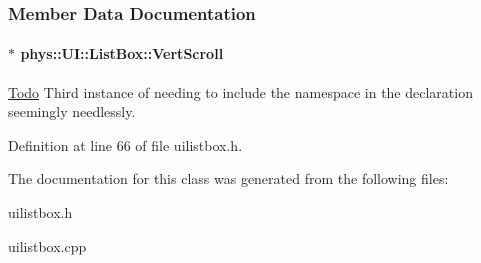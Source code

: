 \subsubsection{Member Data Documentation}
\hypertarget{classphys_1_1UI_1_1ListBox_ab2b012b345ff4bb1a5b228fef88d895c}{
\paragraph[{VertScroll}]{$\ast$ {\bf phys::UI::ListBox::VertScroll}}\hfill}
\label{classphys_1_1UI_1_1ListBox_ab2b012b345ff4bb1a5b228fef88d895c}
\begin{Desc}
\item[\hyperlink{todo__todo000028}{Todo}]Third instance of needing to include the namespace in the declaration seemingly needlessly. \end{Desc}


Definition at line 66 of file uilistbox.h.



The documentation for this class was generated from the following files:\begin{DoxyCompactItemize}
\item 
uilistbox.h\item 
uilistbox.cpp\end{DoxyCompactItemize}
